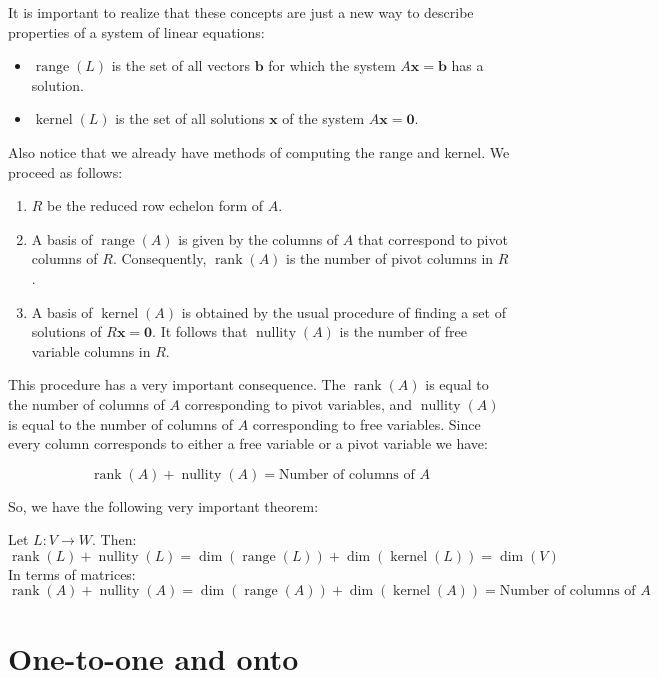 \documentclass[12pt]{article}
\DeclareMathOperator{\range}{range}
\DeclareMathOperator{\rank}{rank}
\DeclareMathOperator{\kernel}{kernel}
\DeclareMathOperator{\nullity}{nullity}
\begin{document}
It is important to realize that these concepts are just a new way to describe properties of a system of linear equations:

\begin{itemize}
\item $\range(L)$ is the set of all vectors $\mathbf{b}$ for which the system $A\mathbf{x}=\mathbf{b}$ has a solution.

\item $\kernel(L)$ is the set of all solutions $\mathbf{x}$ of the system $A\mathbf{x}=\mathbf{0}$.
\end{itemize}

Also notice that we already have methods of computing the range and kernel. We proceed as follows:

\begin{enumerate}

\item $R$ be the reduced row echelon form of $A$.

\item A basis of $\range(A)$ is given by the columns of $A$ that correspond to pivot columns of $R$. Consequently, $\rank(A)$ is the number of pivot columns in $R$.

\item A basis of $\kernel(A)$ is obtained by the usual procedure of finding a set of solutions of $R\mathbf{x}=\mathbf{0}$. It follows that $\nullity(A)$ is the number of free variable columns in $R$.

\end{enumerate}

This procedure has a very important consequence. The $\rank(A)$ is equal to the number of columns of $A$ corresponding to pivot variables, and $\nullity(A)$ is equal to the number of columns of $A$ corresponding to free variables. Since every column corresponds to either a free variable or a pivot variable we have:

\[
\rank(A)+\nullity(A)=\text{Number of columns of $A$}
\]

So, we have the following very important theorem:

\begin{theorem} Let $L:V\to W$. Then:
\[
\rank(L)+\nullity(L)=\dim(\range(L))+\dim(\kernel(L))=\dim(V)
\]
In terms of matrices:
\[
\rank(A)+\nullity(A)=\dim(\range(A))+\dim(\kernel(A))=\text{Number of columns of $A$}
\]
\end{theorem}

\section{One-to-one and onto}
\end{document}
